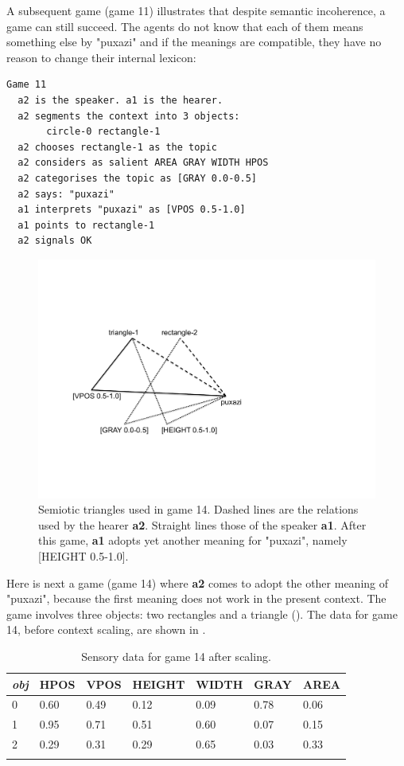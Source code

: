 A subsequent game (game 11) illustrates that despite 
semantic incoherence, a game can still succeed. The agents 
do not know that each of them means something else by 
"puxazi" and if the meanings are compatible, they 
have no reason to change their internal lexicon:
\begin{verbatim}
Game 11
  a2 is the speaker. a1 is the hearer. 
  a2 segments the context into 3 objects: 
       circle-0 rectangle-1
  a2 chooses rectangle-1 as the topic 
  a2 considers as salient AREA GRAY WIDTH HPOS 
  a2 categorises the topic as [GRAY 0.0-0.5]
  a2 says: "puxazi"
  a1 interprets "puxazi" as [VPOS 0.5-1.0]
  a1 points to rectangle-1
  a2 signals OK 
\end{verbatim}

\begin{figure}[htbp]
  \centerline{\includegraphics[width=.60\textwidth]{chap6/figs/triangle3}}
\caption{\label{triangle3} Semiotic triangles used in
game 14. Dashed lines are the relations used by 
the hearer {\bf a2}. Straight lines those of the 
speaker {\bf a1}. After this game, {\bf a1}
adopts yet another meaning for "puxazi", namely 
[HEIGHT 0.5-1.0].}
\end{figure}
Here is next a game (game 14) where {\bf a2} comes to adopt 
the other meaning of "puxazi", because the first
meaning does not work in the present context. 
The game involves three objects: two rectangles and a 
triangle ().
The data for game 14, before context scaling, are
shown in . 
\begin{table}
\begin{center}
\begin{tabular}{ l  l  l  l  l  l  l }
\lsptoprule
{\it obj} & HPOS & VPOS & HEIGHT & WIDTH & GRAY & AREA \\ \midrule
0 & 0.60 & 0.49 & 0.12 & 0.09 & 0.78 & 0.06\\ \midrule
1 & 0.95 & 0.71 & 0.51 & 0.60 & 0.07 & 0.15\\ \midrule
2 & 0.29 & 0.31 & 0.29 & 0.65 & 0.03 & 0.33\\ \midrule
\lspbottomrule
\end{tabular}
\caption{\label{tab:game14} Sensory data for game 14 after scaling.}
\end{center}
\end{table}

